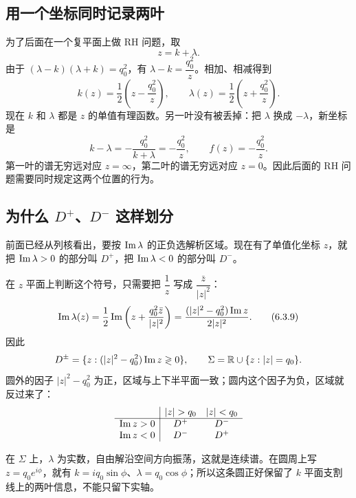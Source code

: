 \documentclass[lang=cn,scheme=chinese,mode=simple,device=normal,color=blue,math=cm,thmcnt=section,12pt]{elegantbook}
\newcommand{\eqq}[2]{\tag{#1}\label{eq:#1}#2}
\begin{document}
\subsection*{用一个坐标同时记录两叶}
为了后面在一个复平面上做 RH 问题，取
\begin{equation}\eqq{6.3.4}{z=k+\lambda.}\end{equation}
由于 $(\lambda-k)(\lambda+k)=q_0^2$，有 $\lambda-k=\dfrac{q_0^2}{z}$。相加、相减得到
\begin{equation}\eqq{6.3.5}{k(z)=\dfrac{1}{2}\left(z-\dfrac{q_0^2}{z}\right),
\qquad \lambda(z)=\dfrac{1}{2}\left(z+\dfrac{q_0^2}{z}\right).}\end{equation}
现在 $k$ 和 $\lambda$ 都是 $z$ 的单值有理函数。另一叶没有被丢掉：把 $\lambda$ 换成 $-\lambda$，新坐标是
\[
k-\lambda=-\dfrac{q_0^2}{k+\lambda}=-\dfrac{q_0^2}{z},
\qquad f(z)=-\dfrac{q_0^2}{z}.
\]
第一叶的谱无穷远对应 $z=\infty$，第二叶的谱无穷远对应 $z=0$。因此后面的 RH 问题需要同时规定这两个位置的行为。

\subsection*{为什么 \(D^+\)、\(D^-\) 这样划分}
前面已经从列核看出，要按 $\operatorname{Im}\lambda$ 的正负选解析区域。现在有了单值化坐标 $z$，就把 $\operatorname{Im}\lambda>0$ 的部分叫 $D^+$，把 $\operatorname{Im}\lambda<0$ 的部分叫 $D^-$。

在 $z$ 平面上判断这个符号，只需要把 $\dfrac{1}{z}$ 写成 $\dfrac{\bar z}{|z|^2}$：
\[
\operatorname{Im}\lambda(z)=\dfrac{1}{2}\operatorname{Im}\left(z+\dfrac{q_0^2\bar z}{|z|^2}\right)
=\dfrac{(|z|^2-q_0^2)\operatorname{Im} z}{2|z|^2}.
\tag{6.3.9}
\]
因此
\[
D^\pm=\{z:(|z|^2-q_0^2)\operatorname{Im} z\gtrless0\},\qquad
\Sigma=\mathbb R\cup\{z:|z|=q_0\}.
\]
圆外的因子 $|z|^2-q_0^2$ 为正，区域与上下半平面一致；圆内这个因子为负，区域就反过来了：
\[
\begin{array}{c|cc}
 & |z|>q_0 & |z|<q_0\\ \hline
\Imm z>0 & D^+ & D^-\\
\Imm z<0 & D^- & D^+
\end{array}
\]
\begin{center}
\end{center}
在 $\Sigma$ 上，$\lambda$ 为实数，自由解沿空间方向振荡，这就是连续谱。在圆周上写 $z=q_0e^{i\phi}$，就有 $k=iq_0\sin\phi$、$\lambda=q_0\cos\phi$；所以这条圆正好保留了 $k$ 平面支割线上的两叶信息，不能只留下实轴。
\end{document}

